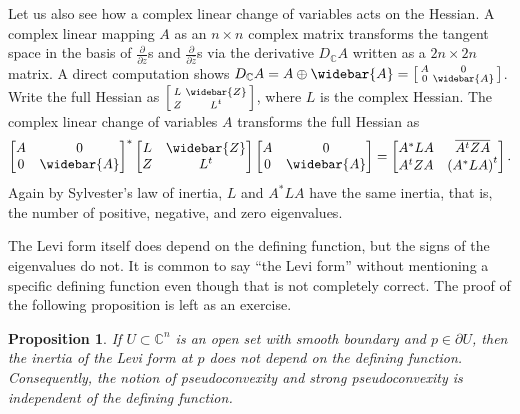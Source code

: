 \documentclass[12pt,openany]{book}
\newcommand{\C}{{\mathbb{C}}}
\theoremstyle{plain}
\newtheorem{prop}[thm]{Proposition}
\theoremstyle{remark}
\theoremstyle{definition}
\theoremstyle{exercise}
\theoremstyle{example}
\begin{document}
Let us also see how a complex linear change of variables
acts on the Hessian.  A complex linear mapping $A$ as
an $n \times n$ complex matrix
transforms the tangent space
in the basis of $\frac{\partial}{\partial z}$s and
$\frac{\partial}{\partial \bar{z}}$s
via the derivative $D_{\C} A$ written as a $2n \times 2n$ matrix.
A direct computation shows $D_{\C} A = A \oplus \widebar{A} =
\left[ \begin{smallmatrix} A & 0 \\ 0 & \widebar{A} \end{smallmatrix}
\right]$.
Write the full Hessian as
$\left[ \begin{smallmatrix} L & \widebar{Z} \\ Z & L^t \end{smallmatrix}
\right]$, where $L$ is the complex Hessian.  The complex linear change
of variables $A$ transforms
the full Hessian as
\begin{equation*}
{\begin{bmatrix} A & 0 \\ 0 & \widebar{A} \end{bmatrix}}^*
\begin{bmatrix} L & \widebar{Z} \\ Z & L^t \end{bmatrix}
\begin{bmatrix} A & 0 \\ 0 & \widebar{A} \end{bmatrix}
=
\begin{bmatrix} A^*LA & \overline{A^tZA} \\ A^tZA & {(A^*LA)}^t \end{bmatrix} .
\end{equation*}
Again by Sylvester's law of inertia,
$L$ and $A^*LA$ have the same inertia, that is,
the number of positive, negative, and zero eigenvalues.

The Levi form itself does depend on the defining function, but the signs of
the eigenvalues do not.  It is common to say ``the
Levi form'' without mentioning a specific defining function
even though that is not completely correct.
The proof of the following proposition is left as an exercise.

\begin{prop} \label{prop:inertiainvariant}
If $U \subset \C^n$ is an open set with smooth boundary and $p \in \partial
U$, then the inertia of the Levi form at $p$
does not depend on the defining function.
Consequently, the notion of pseudoconvexity and strong pseudoconvexity is
independent of the defining function.
\end{prop}
\end{document}
